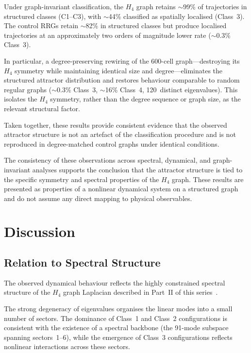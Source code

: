 \documentclass[12pt,a4paper]{article}
\newcommand{\Hfour}{H_4}
\begin{document}
Under graph-invariant classification, the $\Hfour$ graph retains
$\sim$99\% of trajectories in structured classes (C1--C3), with
$\sim$44\% classified as spatially localised (Class~3).  The control
RRGs retain $\sim$82\% in structured classes but produce localised
trajectories at an approximately two orders of magnitude lower rate
($\sim$0.3\% Class~3).

In particular, a degree-preserving rewiring of the 600-cell
graph---destroying its $\Hfour$ symmetry while maintaining identical
size and degree---eliminates the structured attractor distribution and
restores behaviour comparable to random regular graphs ($\sim$0.3\%
Class~3, $\sim$16\% Class~4, 120~distinct eigenvalues).  This isolates
the $\Hfour$ symmetry, rather than the degree sequence or graph size,
as the relevant structural factor.

Taken together, these results provide consistent evidence that the
observed attractor structure is not an artefact of the classification
procedure and is not reproduced in degree-matched control graphs under
identical conditions.

The consistency of these observations across spectral, dynamical, and
graph-invariant analyses supports the conclusion that the attractor
structure is tied to the specific symmetry and spectral properties of
the $\Hfour$ graph.  These results are presented as properties of a
nonlinear dynamical system on a structured graph and do not assume any
direct mapping to physical observables.


\section{Discussion}\label{sec:discussion}

\subsection{Relation to Spectral Structure}\label{sec:disc_spectral}

The observed dynamical behaviour reflects the highly constrained
spectral structure of the $\Hfour$ graph Laplacian described in
Part~II of this series~\cite{paper2}.

The strong degeneracy of eigenvalues organises the linear modes into a
small number of sectors.  The dominance of Class~1 and Class~2
configurations is consistent with the existence of a spectral backbone
(the 91-mode subspace spanning sectors~1--6), while the emergence of
Class~3 configurations reflects nonlinear interactions across these
sectors.
\end{document}
